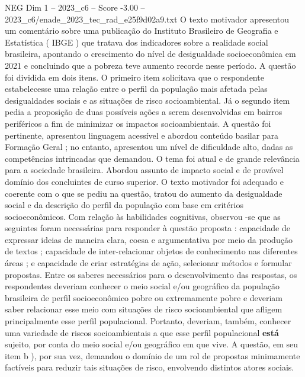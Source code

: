 \begin{textsample}{NEG Dim 1 – 2023\_c6 – Score -3.00 – 2023\_c6/enade\_2023\_tec\_rad\_e25f9d02a9.txt}
O texto motivador apresentou um comentário sobre uma publicação do Instituto Brasileiro de Geografia e Estatística ( IBGE ) que tratava dos indicadores sobre a realidade social brasileira, apontando o crescimento do nível de desigualdade socioeconômica em 2021 e concluindo que a pobreza teve aumento recorde nesse período.
A questão foi dividida em dois itens.
O primeiro item solicitava que o respondente estabelecesse uma relação entre o perfil da população mais afetada pelas desigualdades sociais e as situações de risco socioambiental.
Já o segundo item pedia a proposição de duas possíveis ações a serem desenvolvidas em bairros periféricos a fim de minimizar os impactos socioambientais.
A questão foi pertinente, apresentou linguagem acessível e abordou conteúdo basilar para Formação Geral ; no entanto, apresentou um nível de dificuldade alto, dadas as competências intrincadas que demandou.
O tema foi atual e de grande relevância para a sociedade brasileira.
Abordou assunto de impacto social e de provável domínio dos concluintes de curso superior.
O texto motivador foi adequado e coerente com o que se pediu na questão, tratou do aumento da desigualdade social e da descrição do perfil da população com base em critérios socioeconômicos.
Com relação às habilidades cognitivas, observou -se que as seguintes foram necessárias para responder à questão proposta : capacidade de expressar ideias de maneira clara, coesa e argumentativa por meio da produção de textos ; capacidade de inter-relacionar objetos de conhecimento nas diferentes áreas ; e capacidade de criar estratégias de ação, selecionar métodos e formular propostas.
Entre os saberes necessários para o desenvolvimento das respostas, os respondentes deveriam conhecer o meio social e/ou geográfico da população brasileira de perfil socioeconômico pobre ou extremamente pobre e deveriam saber relacionar esse meio com situações de risco socioambiental que afligem principalmente esse perfil populacional.
Portanto, deveriam, também, conhecer uma variedade de riscos socioambientais a que esse perfil populacional \textbf{está} sujeito, por conta do meio social e/ou geográfico em que vive.
A questão, em seu item b ), por sua vez, demandou o domínio de um rol de propostas minimamente factíveis para reduzir tais situações de risco, envolvendo distintos atores sociais.

\end{textsample}
